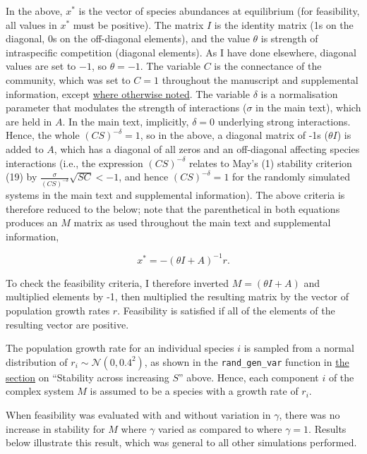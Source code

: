 \documentclass[]{article}
\begin{document}
In the above, \(x^{*}\) is the vector of species abundances at
equilibrium (for feasibility, all values in \(x^{*}\) must be positive).
The matrix \(I\) is the identity matrix (1s on the diagonal, 0s on the
off-diagonal elements), and the value \(\theta\) is strength of
intraspecific competition (diagonal elements). As I have done elsewhere,
diagonal values are set to \(-1\), so \(\theta = -1\). The variable
\(C\) is the connectance of the community, which was set to \(C = 1\)
throughout the manuscript and supplemental information, except
\protect\hyperlink{connectance}{where otherwise noted}. The variable
\(\delta\) is a normalisation parameter that modulates the strength of
interactions (\(\sigma\) in the main text), which are held in \(A\). In
the main text, implicitly, \(\delta = 0\) underlying strong
interactions. Hence, the whole \((CS)^{-\delta} = 1\), so in the above,
a diagonal matrix of -1s (\(\theta I\)) is added to \(A\), which has a
diagonal of all zeros and an off-diagonal affecting species interactions
(i.e., the expression \((CS)^{-\delta}\) relates to May's (1) stability
criterion (19) by \(\frac{\sigma}{(CS)^{-\delta}}\sqrt{SC} < -1\), and
hence \((CS)^{-\delta} = 1\) for the randomly simulated systems in the
main text and supplemental information). The above criteria is therefore
reduced to the below; note that the parenthetical in both equations
produces an \(M\) matrix as used throughout the main text and
supplemental information,

\[x^{*} = -\left(\theta I + A\right)^{-1}r.\]

To check the feasibility criteria, I therefore inverted
\(M = (\theta I + A)\) and multiplied elements by -1, then multiplied
the resulting matrix by the vector of population growth rates \(r\).
Feasibility is satisfied if all of the elements of the resulting vector
are positive.

The population growth rate for an individual species \(i\) is sampled
from a normal distribution of \(r_{i} \sim \mathcal{N}(0, 0.4^{2})\), as
shown in the \texttt{rand\_gen\_var} function in
\protect\hyperlink{IncrS}{the section} on ``Stability across increasing
\(S\)'' above. Hence, each component \(i\) of the complex system \(M\)
is assumed to be a species with a growth rate of \(r_{i}\).

When feasibility was evaluated with and without variation in \(\gamma\),
there was no increase in stability for \(M\) where \(\gamma\) varied as
compared to where \(\gamma = 1\). Results below illustrate this result,
which was general to all other simulations performed.
\end{document}
